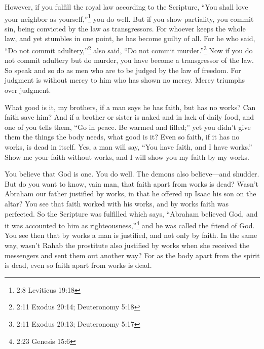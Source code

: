 \myverse{}However, if you fulfill the royal law according to the Scripture,
“You shall love your neighbor as yourself,”\footnote{2:8 Leviticus 19:18} you do well.
\myverse{}But if you show partiality, you commit sin, being convicted by the law as transgressors.
\myverse{}For whoever keeps the whole law, and yet stumbles in one point, he has become
guilty of all.
\myverse{}For he who said, “Do not commit adultery,”\footnote{2:11 Exodus 20:14;
	Deuteronomy 5:18} also said, “Do not commit murder.”\footnote{2:11 Exodus 20:13;
	Deuteronomy 5:17
} Now if you do not commit adultery but do murder, you have become a transgressor of the law.
\myverse{}So speak and so do as men who are to be judged by the law of freedom.
\myverse{}For judgment is without mercy to him who has shown no mercy. Mercy triumphs
over judgment.

\myverse{}What good is it, my brothers, if a man says he has faith, but
has no works? Can faith save him?
\myverse{}And if a brother or sister is naked and in lack of daily food,
\myverse{}and one of you tells them, “Go in peace. Be warmed and filled;” yet you didn’t
give them the things the body needs, what good is it?
\myverse{}Even so faith, if it has no works, is dead in itself.
\myverse{}Yes, a man will say, “You have faith, and I have works.” Show me your faith
without works, and I will show you my faith by my works.

\myverse{}You believe that God is one. You do well. The demons also believe—and
shudder.
\myverse{}But do you want to know, vain man, that faith apart from works is dead?
\myverse{}Wasn’t Abraham our father justified by works, in that he offered up Isaac
his son on the altar?
\myverse{}You see that faith worked with his works, and by works faith was perfected.
\myverse{}So the Scripture was fulfilled which says, “Abraham believed God, and it was
accounted to him as righteousness,”\footnote{2:23 Genesis 15:6} and he was called the friend of God.
\myverse{}You see then that by works a man is justified, and not only by faith.
\myverse{}In the same way, wasn’t Rahab the prostitute also justified by works when
she received the messengers and sent them out another way?
\myverse{}For as the body apart from the spirit is dead, even so faith apart from works
is dead.


